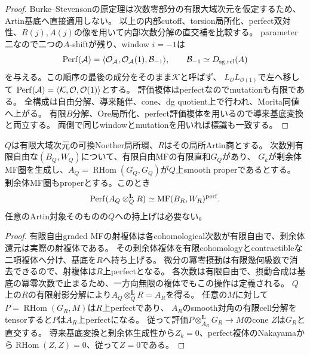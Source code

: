 \begin{proof}
Burke--Stevenson\cite{BS}の原定理は次数零部分の有限大域次元を仮定するため、Artin基底へ直接適用しない。
以上の内部cutoff、torsion局所化、perfect双対性、$R(j),A(j)$の像を用いて内部次数分解の直交補を比較する。
parameter二なので二つの$A$-shiftが残り、window $i=-1$は
\[
 \operatorname{Perf}(\mathcal A)=\langle\mathcal O_{\mathcal A},\mathcal O_{\mathcal A}(1),\mathcal B_{-1}\rangle,
 \qquad\mathcal B_{-1}\simeq D_{\rm sg,rel}(A)
\]
を与える。この順序の最後の成分をそのまま$\mathcal K$と呼ばず、
$L_{\mathcal O}L_{\mathcal O(1)}$で左へ移して
$\operatorname{Perf}(\mathcal A)=\langle\mathcal K,\mathcal O,\mathcal O(1)\rangle$とする。
評価複体はperfectなのでmutationも有限である。
全構成は自由分解、導来随伴、cone、dg quotient上で行われ、Morita同値へ上がる。
有限$B$分解、Ore局所化、perfect評価複体を用いるので導来基底変換と両立する。
両側で同じwindowとmutationを用いれば標識も一致する。
\end{proof}

\begin{lemma}[生成子一つの持上げによる基底変換]
$Q$は有限大域次元の可換Noether局所環、$R$はその局所Artin商とする。
次数別有限自由な$(B_Q,W_Q)$について、有限自由MFの有限直和$G_Q$があり、
$G_k$が剰余体MF圏を生成し、$A_Q=\operatorname{RHom}(G_Q,G_Q)$が$Q$上smooth properであるとする。
剰余体MF圏もproperとする。このとき
\[
 \operatorname{Perf}(A_Q\otimes_Q^{\mathbf L}R)\simeq\operatorname{MF}(B_R,W_R)^{\rm perf}.
\]
任意のArtin対象そのものの$Q$への持上げは必要ない。
\end{lemma}
\begin{proof}
有限自由graded MFの射複体は各cohomological次数が有限自由で、剰余体還元は実際の射複体である。
その剰余体複体を有限cohomologyとcontractibleな二項複体へ分け、基底を$R$へ持ち上げる。
微分の冪零摂動は有限幾何級数で消去できるので、射複体は$R$上perfectとなる。
各次数は有限自由で、摂動合成は基底の冪零次数で止まるため、一方向無限の複体でもこの操作は定義される。
$Q$上の$R$の有限射影分解により$A_Q\otimes_Q^{\mathbf L}R=A_R$を得る。
任意の$M$に対して$P=\operatorname{RHom}(G_R,M)$は$R$上perfectであり、
$A_R$のsmooth対角の有限cell分解をtensorすると$P$は$A_R$上perfectになる。
従って評価$P\otimes_{A_R}^{\mathbf L}G_R\to M$のcone $Z$は$G_R$と直交する。
導来基底変換と剰余体生成性から$Z_k=0$、perfect複体のNakayamaから$\operatorname{RHom}(Z,Z)=0$、従って$Z=0$である。
\end{proof}
